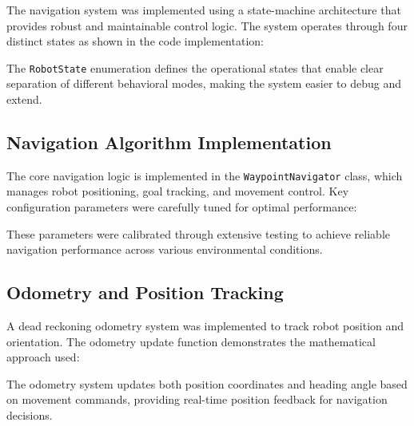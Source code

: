\documentclass{book}
\begin{document}
\par\noindent The navigation system was implemented using a state-machine architecture that provides robust and maintainable control logic. The system operates through four distinct states as shown in the code implementation:



\par\noindent The \texttt{RobotState} enumeration defines the operational states that enable clear separation of different behavioral modes, making the system easier to debug and extend.

\subsection{Navigation Algorithm Implementation}

\par\noindent The core navigation logic is implemented in the \texttt{WaypointNavigator} class, which manages robot positioning, goal tracking, and movement control. Key configuration parameters were carefully tuned for optimal performance:



\par\noindent These parameters were calibrated through extensive testing to achieve reliable navigation performance across various environmental conditions.

\subsection{Odometry and Position Tracking}

\par\noindent A dead reckoning odometry system was implemented to track robot position and orientation. The odometry update function demonstrates the mathematical approach used:



\par\noindent The odometry system updates both position coordinates and heading angle based on movement commands, providing real-time position feedback for navigation decisions.
\end{document}
